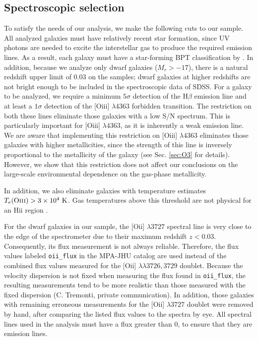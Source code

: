 \subsection{Spectroscopic selection}

To satisfy the needs of our analysis, we make the following cuts to our sample.  
All analyzed galaxies must have relatively recent star formation, since UV 
photons are needed to excite the interstellar gas to produce the required 
emission lines.  As a result, each galaxy must have a star-forming BPT 
classification by \cite{Brinchmann04}.  In addition, because we analyze only 
dwarf galaxies ($M_r > -17$), there is a natural redshift upper limit of 0.03 on 
the samples; dwarf galaxies at higher redshifts are not bright enough to be 
included in the spectroscopic data of SDSS.  For a galaxy to be analyzed, we 
require a minimum $5\sigma$ detection of the H$\beta$ emission line and at least 
a $1\sigma$ detection of the [O{\sc iii}] $\lambda 4363$ forbidden transition.  
The restriction on both these lines eliminate those galaxies with a low S/N 
spectrum.  This is particularly important for [O{\sc iii}] $\lambda 4363$, as it 
is inherently a weak emission line.  We are aware that implementing this 
restriction on [O{\sc iii}] $\lambda 4363$ eliminates those galaxies with higher 
metallicities, since the strength of this line is inversely proportional to the 
metallicity of the galaxy (see Sec. \ref{sec:O3} for details).  However, we show 
that this restriction does not affect our conclusions on the large-scale 
environmental dependence on the gas-phase metallicity.

In addition, we also eliminate galaxies with temperature estimates 
$T_e (\text{O{\sc iii}}) > 3\times 10^4\text{ K}$.  Gas temperatures above this 
threshold are not physical for an H{\sc ii} region \citep[inferred 
from][]{Osterbrock89, Izotov06, Luridiana15}.

For the dwarf galaxies in our sample, the [O{\sc ii}] $\lambda 3727$ spectral 
line is very close to the edge of the spectrometer due to their maximum redshift 
$z < 0.03$.  Consequently, its flux measurement is not always reliable.  
Therefore, the flux values labeled \texttt{oii\_flux} in the MPA-JHU catalog are 
used instead of the combined flux values measured for the [O{\sc ii}] 
$\lambda \lambda 3726,3729$ doublet.  Because the velocity dispersion is not 
fixed when measuring the flux found in \texttt{oii\_flux}, the resulting 
measurements tend to be more realistic than those measured with the fixed 
dispersion (C. Tremonti, private communication).  In addition, those galaxies 
with remaining erroneous measurements for the [O{\sc ii}] $\lambda 3727$ 
doublet were removed by hand, after comparing the listed flux values to the 
spectra by eye.  All spectral lines used in the analysis must have a flux 
greater than 0, to ensure that they are emission lines.


